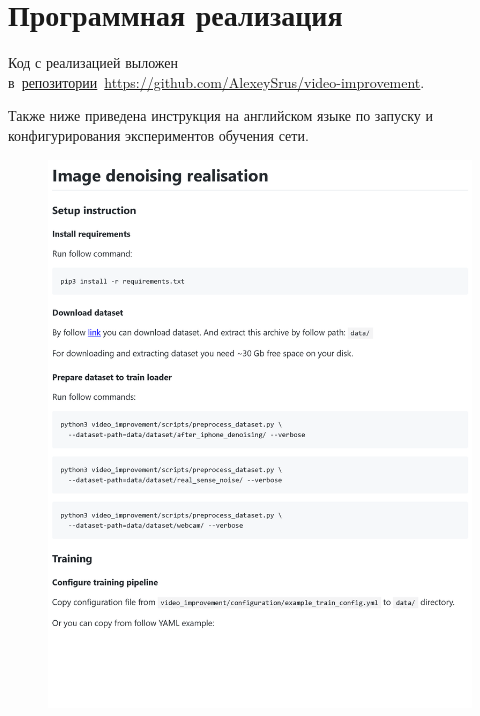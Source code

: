 \chapter{Программная реализация}


Код с реализацией выложен в~\href{https://github.com/AlexeySrus/video-improvement}{репозитории}~\url{https://github.com/AlexeySrus/video-improvement}. 

Также ниже приведена инструкция на английском языке по запуску и конфигурирования  экспериментов обучения сети.


\begin{figure}[h]
	\centering
	\includegraphics[width=\textwidth]{img/markdown/README_1}
	\label{fig:markdown_1}
\end{figure}

